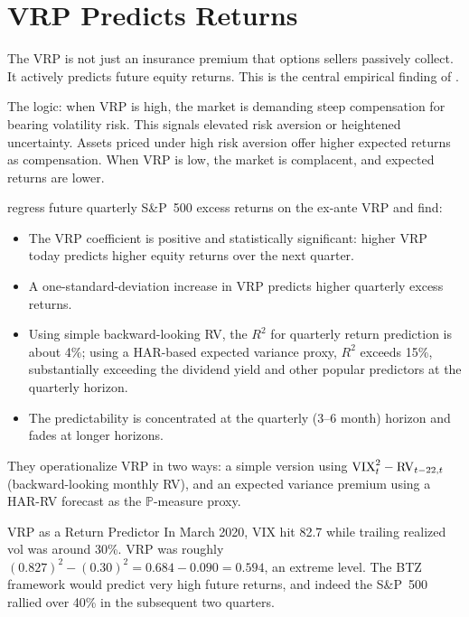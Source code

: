 \section{VRP Predicts Returns}
\label{sec:vrp-returns}

The VRP is not just an insurance premium that options sellers passively collect.
It actively predicts future equity returns.
This is the central empirical finding of \citet{BTZ2009}.

The logic: when VRP is high, the market is demanding steep compensation for bearing volatility risk.
This signals elevated risk aversion or heightened uncertainty.
Assets priced under high risk aversion offer higher expected returns as compensation.
When VRP is low, the market is complacent, and expected returns are lower.

\begin{keyresult}
\label{res:btz2009}
\citet{BTZ2009} regress future quarterly S\&P~500 excess returns on the ex-ante VRP and find:
\begin{itemize}[nosep]
  \item The VRP coefficient is positive and statistically significant: higher VRP today predicts higher equity returns over the next quarter.
  \item A one-standard-deviation increase in VRP predicts higher quarterly excess returns.
  \item Using simple backward-looking RV, the $R^2$ for quarterly return prediction is about 4\%; using a HAR-based expected variance proxy, $R^2$ exceeds 15\%, substantially exceeding the dividend yield and other popular predictors at the quarterly horizon.
  \item The predictability is concentrated at the quarterly (3--6 month) horizon and fades at longer horizons.
\end{itemize}
They operationalize VRP in two ways: a simple version using $\text{VIX}^2_t - \operatorname{RV}_{t-22,t}$ (backward-looking monthly RV), and an expected variance premium using a HAR-RV forecast as the $\mathbb{P}$-measure proxy.
\end{keyresult}

\begin{workedexample}{VRP as a Return Predictor}
In March 2020, VIX hit 82.7 while trailing realized vol was around 30\%.
VRP was roughly $(0.827)^2 - (0.30)^2 = 0.684 - 0.090 = 0.594$, an extreme level.
The BTZ framework would predict very high future returns, and indeed the S\&P~500 rallied over 40\% in the subsequent two quarters.
\end{workedexample}

